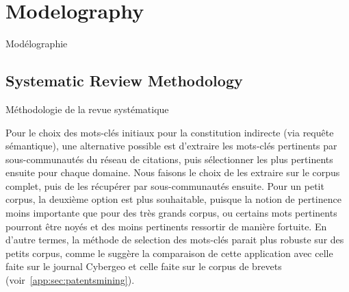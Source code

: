 \stars






\newpage

\section{Modelography}{Modélographie}

\label{app:sec:modelography}





\subsection{Systematic Review Methodology}{Méthodologie de la revue systématique}


Pour le choix des mots-clés initiaux pour la constitution indirecte (via requête sémantique), une alternative possible est d'extraire les mots-clés pertinents par sous-communautés du réseau de citations, puis sélectionner les plus pertinents ensuite pour chaque domaine. Nous faisons le choix de les extraire sur le corpus complet, puis de les récupérer par sous-communautés ensuite. Pour un petit corpus, la deuxième option est plus souhaitable, puisque la notion de pertinence moins importante que pour des très grands corpus, ou certains mots pertinents pourront être noyés et des moins pertinents ressortir de manière fortuite. En d'autre termes, la méthode de selection des mots-clés parait plus robuste sur des petits corpus, comme le suggère la comparaison de cette application avec celle faite sur le journal Cybergeo et celle faite sur le corpus de brevets (voir~\ref{app:sec:patentsmining}).





